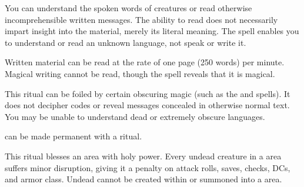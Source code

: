 \spellrng{\rngpers}
\spelldur{\durlong}
\begin{spelleffect}
  You can understand the spoken words of creatures or read otherwise incomprehensible written messages. The ability to read does not necessarily impart insight into the material, merely its literal meaning. The spell enables you to understand or read an unknown language, not speak or write it.
  \par Written material can be read at the rate of one page (250 words) per minute. Magical writing cannot be read, though the spell reveals that it is magical. 
\end{spelleffect}
\begin{spellnotes}
  This ritual can be foiled by certain obscuring magic (such as the  and  spells). It does not decipher codes or reveal messages concealed in otherwise normal text. You may be unable to understand dead or extremely obscure languages.

   can be made permanent with a  ritual.
\end{spellnotes}

\spellrng{\rngclose}
\begin{spelleffect}
This ritual blesses an area with holy power. Every undead creature in a  area suffers minor disruption, giving it a  penalty on attack rolls, saves, checks, DCs, and armor class. Undead cannot be created within or summoned into a  area.
\end{spelleffect}


